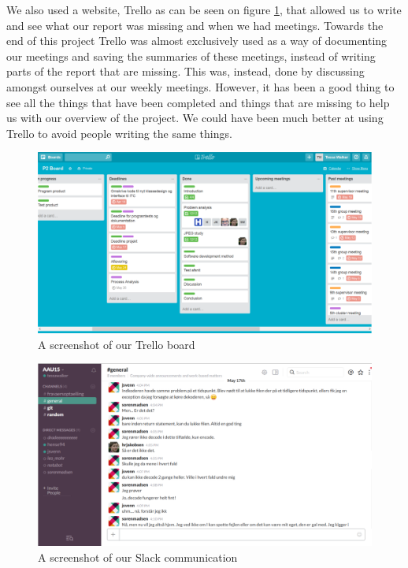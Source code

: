 \documentclass{article}
\begin{document}
We also used a website, Trello as can be seen on figure \ref{fig:trello}, that allowed us to write and see what our report was missing and when we had meetings. 
Towards the end of this project Trello was almost exclusively used as a way of documenting our meetings and saving the summaries of these meetings, instead of writing parts of the report that are missing. 
This was, instead, done by discussing amongst ourselves at our weekly meetings.
However, it has been a good thing to see all the things that have been completed and things that are missing to help us with our overview of the project.
We could have been much better at using Trello to avoid people writing the same things.

\begin{figure}
	\centering
	\includegraphics[width=1 \textwidth]{figures/trello.png}
	\caption{A screenshot of our Trello board}
	\label{fig:trello}
\end{figure}

\begin{figure}
	\centering
	\includegraphics[width=1 \textwidth]{figures/slack.png}
	\caption{A screenshot of our Slack communication}
	\label{fig:slack}
\end{figure}
\end{document}

